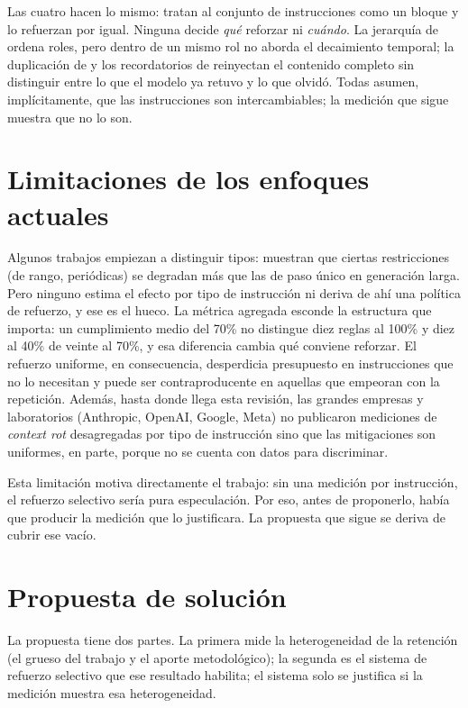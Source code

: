 \documentclass[12pt]{article}
\begin{document}
Las cuatro hacen lo mismo: tratan al conjunto de instrucciones como un bloque y lo
refuerzan por igual. Ninguna decide \emph{qué} reforzar ni \emph{cuándo}. La
jerarquía de \citet{wallace2024} ordena roles, pero dentro de un mismo rol no
aborda el decaimiento temporal; la duplicación de \citet{leviathan2025} y los
recordatorios de \citet{dongre2025} reinyectan el contenido completo sin distinguir
entre lo que el modelo ya retuvo y lo que olvidó. Todas asumen, implícitamente, que
las instrucciones son intercambiables; la medición que sigue muestra que no lo son.

\section{Limitaciones de los enfoques actuales}

Algunos trabajos empiezan a distinguir tipos: \citet{longgenbench} muestran que
ciertas restricciones (de rango, periódicas) se degradan más que las de paso único
en generación larga. Pero ninguno estima el efecto por tipo de instrucción ni
deriva de ahí una política de refuerzo, y ese es el hueco. La métrica agregada
esconde la estructura que importa: un cumplimiento medio del 70\% no distingue
diez reglas al 100\% y diez al 40\% de veinte al 70\%, y esa diferencia cambia qué
conviene reforzar. El refuerzo uniforme, en consecuencia, desperdicia presupuesto
en instrucciones que no lo necesitan y puede ser contraproducente en aquellas que
empeoran con la repetición. Además, hasta donde llega esta revisión, las grandes
empresas y laboratorios (Anthropic, OpenAI, Google, Meta) no publicaron mediciones
de \emph{context rot} desagregadas por tipo de instrucción sino que las
mitigaciones son uniformes, en parte, porque no se cuenta con datos para
discriminar.

Esta limitación motiva directamente el trabajo: sin una medición por instrucción,
el refuerzo selectivo sería pura especulación. Por eso, antes de proponerlo, había
que producir la medición que lo justificara. La propuesta que sigue se deriva de
cubrir ese vacío.

\section{Propuesta de solución}

La propuesta tiene dos partes. La primera mide la heterogeneidad de la retención
(el grueso del trabajo y el aporte metodológico); la segunda es el sistema de
refuerzo selectivo que ese resultado habilita; el sistema solo se justifica si la
medición muestra esa heterogeneidad.
\end{document}
